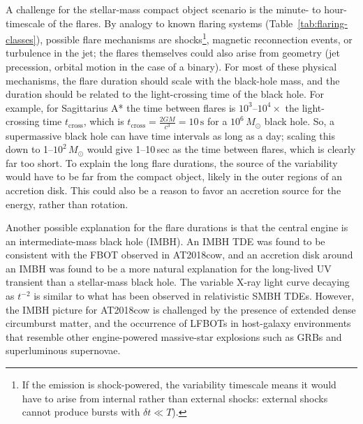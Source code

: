 \documentclass{nature_plusfigure}
\begin{document}
\begin{methods}
A challenge for the stellar-mass compact object scenario is the minute- to hour-timescale of the flares. By analogy to known flaring systems (Table~\ref{tab:flaring-classes}), possible flare mechanisms are shocks\footnote{If the emission is shock-powered, the variability timescale means it would have to arise from internal rather than external shocks: external shocks cannot\cite{Kumar2015} produce bursts with $\delta t\ll T$).
}, magnetic reconnection events, or turbulence in the jet; the flares themselves could also arise from geometry (jet precession, orbital motion in the case of a binary). For most of these physical mechanisms, the flare duration should scale with the black-hole mass, and the duration should be related to the light-crossing time of the black hole. 
For example, for Sagittarius A* the time between flares is $10^{3}$--$10^{4}\times$ the light-crossing time $t_\mathrm{cross}$, which is $t_\mathrm{cross}=\frac{2GM}{c^3}=10\,\mathrm{s}$ for a $10^6\,M_\odot$ black hole.
So, a supermassive black hole can have time intervals as long as a day; scaling this down to 1--$10^2\,M_\odot$ would give 1--10\,sec as the time between flares, which is clearly far too short.
To explain the long flare durations, the source of the variability would have to be far from the compact object, likely in the outer regions of an accretion disk\cite{Metzger2022}. This could also be a reason to favor an accretion source for the energy, rather than rotation.

Another possible explanation for the flare durations is that the central engine is an intermediate-mass black hole (IMBH). An IMBH TDE was found to be consistent with the FBOT observed in AT2018cow\cite{Kuin2019,Perley2019}, and an accretion disk around an IMBH was found to be a more natural explanation for the long-lived UV transient than a stellar-mass black hole\cite{Chen2023}. The variable X-ray light curve decaying as $t^{-2}$ is similar to what has been observed in relativistic SMBH TDEs. However, the IMBH picture for AT2018cow is challenged\cite{Margutti2019,Metzger2022} by the presence of extended dense circumburst matter\cite{Ho2019,Nayana2021}, and the occurrence of LFBOTs in host-galaxy environments that resemble other engine-powered massive-star explosions such as GRBs and superluminous supernovae\cite{Lyman2020}. 


\end{methods}
\end{document}
